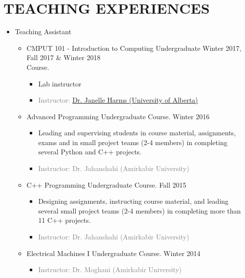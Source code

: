 \section{TEACHING EXPERIENCES}
\begin{itemize}
	\item Teaching Assistant
	\begin{itemize}
	
		\item {} CMPUT 101 - Introduction to Computing Undergraduate  \hfill Winter 2017, Fall 2017 \& Winter 2018
		\\ Course.
		\begin{itemize} 
			\item Lab instructor
			
			\item\textcolor{gray}{Instructor: \href{https://webdocs.cs.ualberta.ca/~harms/}{Dr. Janelle Harms (University of Alberta)}}
		\end{itemize}
			
		\item {} Advanced Programming Undergraduate Course. \hfill Winter 2016
		\begin{itemize} 
			\item Leading and supervising students in course material, assignments, exams and in small project teams (2-4 members) in completing several Python and C++ projects.
			\item\textcolor{gray}{Instructor: Dr. Jahanshahi (Amirkabir University)}
		\end{itemize}
		
		\item {} C++ Programming Undergraduate Course. \hfill Fall 2015
		\begin{itemize} 
			\item Designing assignments, instructing course material, and leading several small project teams (2-4 members) in completing more than 11 C++ projects.
			\item \textcolor{gray}{Instructor: Dr. Jahanshahi (Amirkabir University)}
		\end{itemize}
		
		\item {} Electrical Machines I Undergraduate Course. \hfill Winter 2014
		\begin{itemize} 
			\item \textcolor{gray}{Instructor: Dr. Moghani (Amirkabir University)}
		\end{itemize}
		

\end{itemize}
\end{itemize}
